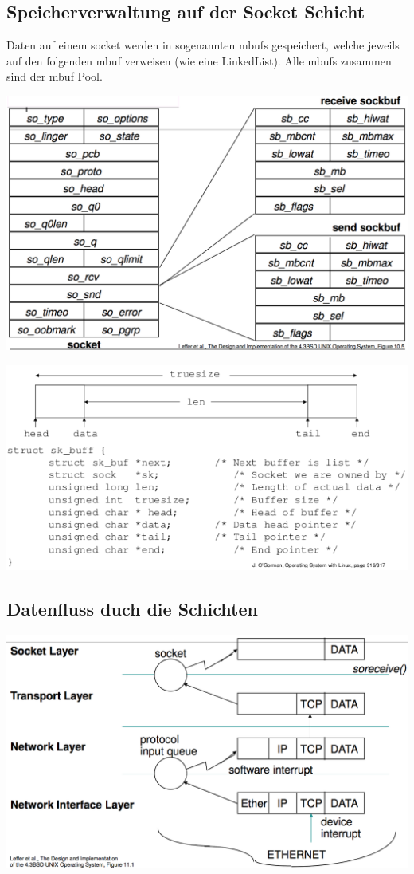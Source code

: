 \documentclass[10pt]{article}
\begin{document}
\subsection{Speicherverwaltung auf der Socket Schicht}
Daten auf einem socket werden in sogenannten mbufs gespeichert, welche jeweils auf den folgenden mbuf verweisen (wie eine LinkedList). Alle mbufs zusammen sind der mbuf Pool.
\begin{center}
	\includegraphics[scale=0.2]{socket-datenstruktur.png}
\end{center}
\begin{center}
	\includegraphics[scale=0.5]{socket-buffer.png}
\end{center}

\subsection{Datenfluss duch die Schichten}
\begin{center}
	\includegraphics[scale=0.2]{socket-datenfluss.png}
\end{center}
\end{document}
